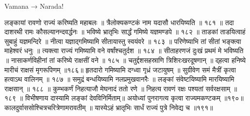 Vamana → Narada!

लङ्कायां रावणो राज्यं करिष्यति महाबलः ॥
त्रैलोक्यकण्टकं नाम यदासौ धारयिष्यति ॥ १८१ ॥
तदा दाशरथी रामः कौसल्यानन्दवर्द्धनः ॥
भविष्ये भ्रातृभिः सार्द्धं गमिष्ये यज्ञमण्डपे ॥ १८२ ॥
ताडकां ताडयित्वाहं सुबाहुं यज्ञमन्दिरे ॥
नीत्वा यज्ञाद्गमिष्यामि सीतायास्तु स्वयंवरे ॥ १८३ ॥
परिणेष्याभि तां सीतां भङ्क्त्वा माहेश्वरं धनुः ॥
त्यक्त्वा राज्यं गमिष्यामि वने वर्षांश्चतुर्दश ॥ १८४ ॥
सीताहरणजं दुःखं प्रथमं मे भविष्यति ॥
नासाकर्णविहीनां तां करिष्ये राक्षसीं वने ॥ १८५ ॥
चतुर्द्दशसहस्राणि त्रिशिरःखरदूषणान् ॥
द्हत्वा हनिष्ये मारीचं राक्षसं मृगरूपिणम् ॥१८६॥
हृतदारो गमिष्यामि दग्ध्वा गृध्रं जटायुषम् ॥
सुग्रीवेण समं मैत्रीं कृत्वा हत्वाऽथ वालिनम् ॥ १८७ ॥
समुद्रं बन्धयिष्यामि नलप्रमुखवानरैः ॥
लङ्कां संवेष्टयिष्यामि मारयिष्यामि राक्षसान् ॥ १८८ ॥
कुम्भकर्णं निहत्याजौ मेघनादं ततो रणे ॥
निहत्य रावणं रक्षः पश्यतां सर्वरक्षसाम् ॥ १८९ ॥
विभीषणाय दास्यामि लङ्कां देवविनिर्मिताम्॥
अयोध्यां पुनरागत्य कृत्वा राज्यमकण्टकम् ॥१९०॥
कालदुर्वाससोश्चित्रचरित्रेणामरावतीम् ॥
यास्येऽहं भ्रातृभिः सार्धं राज्यं पुत्रे निवेद्य च ॥१९१॥